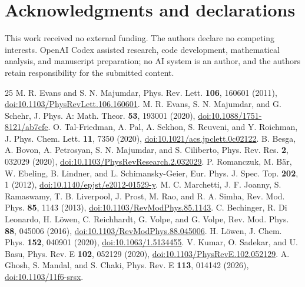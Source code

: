 \documentclass[aps,pre,amsmath,amssymb,nofootinbib]{revtex4-2}
\begin{document}
\section*{Acknowledgments and declarations}
This work received no external funding. The authors declare no competing interests. OpenAI Codex assisted research, code development, mathematical analysis, and manuscript preparation; no AI system is an author, and the authors retain responsibility for the submitted content.
\begin{thebibliography}{25}
 M. R. Evans and S. N. Majumdar, Phys. Rev. Lett. \textbf{106}, 160601 (2011), \href{https://doi.org/10.1103/PhysRevLett.106.160601}{doi:10.1103/PhysRevLett.106.160601}.
 M. R. Evans, S. N. Majumdar, and G. Schehr, J. Phys. A: Math. Theor. \textbf{53}, 193001 (2020), \href{https://doi.org/10.1088/1751-8121/ab7cfe}{doi:10.1088/1751-8121/ab7cfe}.
 O. Tal-Friedman, A. Pal, A. Sekhon, S. Reuveni, and Y. Roichman, J. Phys. Chem. Lett. \textbf{11}, 7350 (2020), \href{https://doi.org/10.1021/acs.jpclett.0c02122}{doi:10.1021/acs.jpclett.0c02122}.
 B. Besga, A. Bovon, A. Petrosyan, S. N. Majumdar, and S. Ciliberto, Phys. Rev. Res. \textbf{2}, 032029 (2020), \href{https://doi.org/10.1103/PhysRevResearch.2.032029}{doi:10.1103/PhysRevResearch.2.032029}.
 P. Romanczuk, M. B\"ar, W. Ebeling, B. Lindner, and L. Schimansky-Geier, Eur. Phys. J. Spec. Top. \textbf{202}, 1 (2012), \href{https://doi.org/10.1140/epjst/e2012-01529-y}{doi:10.1140/epjst/e2012-01529-y}.
 M. C. Marchetti, J. F. Joanny, S. Ramaswamy, T. B. Liverpool, J. Prost, M. Rao, and R. A. Simha, Rev. Mod. Phys. \textbf{85}, 1143 (2013), \href{https://doi.org/10.1103/RevModPhys.85.1143}{doi:10.1103/RevModPhys.85.1143}.
 C. Bechinger, R. Di Leonardo, H. L\"owen, C. Reichhardt, G. Volpe, and G. Volpe, Rev. Mod. Phys. \textbf{88}, 045006 (2016), \href{https://doi.org/10.1103/RevModPhys.88.045006}{doi:10.1103/RevModPhys.88.045006}.
 H. L\"owen, J. Chem. Phys. \textbf{152}, 040901 (2020), \href{https://doi.org/10.1063/1.5134455}{doi:10.1063/1.5134455}.
 V. Kumar, O. Sadekar, and U. Basu, Phys. Rev. E \textbf{102}, 052129 (2020), \href{https://doi.org/10.1103/PhysRevE.102.052129}{doi:10.1103/PhysRevE.102.052129}.
 A. Ghosh, S. Mandal, and S. Chaki, Phys. Rev. E \textbf{113}, 014142 (2026), \href{https://doi.org/10.1103/11f6-srsx}{doi:10.1103/11f6-srsx}.

\end{thebibliography}
\end{document}

